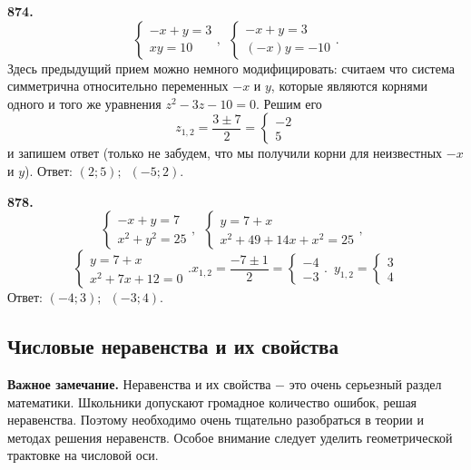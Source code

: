 \textbf{874.}  $$\begin{cases}-x+y=3\\ xy=10 \end{cases},\enspace \begin{cases}-x+y=3\\ (-x)y=-10 \end{cases}.$$ Здесь предыдущий прием можно немного модифицировать: считаем что система симметрична относительно переменных $-x$ и  $y$, которые являются корнями одного и того же уравнения \newline$z^2-3z-10=0$. Решим его  $$z_{1,2}=\frac{3\pm7}{2}=\begin{cases}-2\\ 5 \end{cases}$$ и запишем ответ (только не забудем, что мы получили корни для неизвестных $-x$ и $y$). \newline \null \hspace*{\fill} Ответ: $(2;5);\enspace(-5;2)$. 

\textbf{878.} $$\begin{cases}-x+y=7\\ x^2+y^2=25 \end{cases},\enspace \begin{cases}y=7+x\\ x^2+49+14x+x^2=25 \end{cases},\enspace $$$$\begin{cases}y=7+x\\ x^2+7x+12=0 \end{cases}.x_{1,2}=\frac{-7\pm1}{2}=\begin{cases}-4\\-3 \end{cases}.\enspace y_{1,2}=\begin{cases}3\\4 \end{cases}$$ \newline \null \hspace*{\fill} Ответ: $(-4;3);\enspace(-3;4)$.


\subsection{Числовые неравенства и их свойства}


\textbf{Важное замечание.} Неравенства и их свойства $-$ это очень серьезный раздел математики. Школьники допускают громадное количество ошибок, решая неравенства. Поэтому необходимо очень тщательно разобраться в теории и методах решения неравенств. Особое внимание следует уделить геометрической трактовке на числовой оси.

